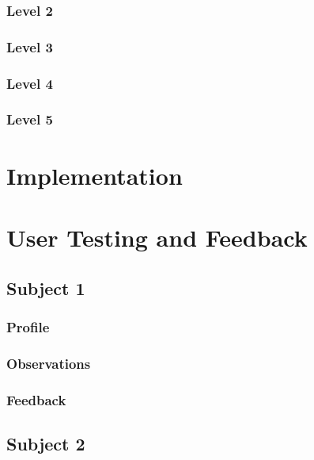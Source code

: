 \subsubsection{Level 2}

\subsubsection{Level 3}

\subsubsection{Level 4}

\subsubsection{Level 5} 

\section{Implementation}
\label{sec:game_implementation}


\section{User Testing and Feedback}
\label{sec:game_testing}


\subsection{Subject 1}
\label{sec:game_testing_subject1}

\subsubsection{Profile}

\subsubsection{Observations}

\subsubsection{Feedback}


\subsection{Subject 2}
\label{sec:game_testing_subject2}


